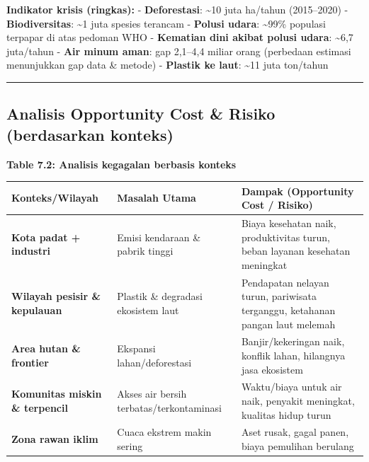 \documentclass[
  letterpaper,
  DIV=11,
  numbers=noendperiod]{scrreprt}
\begin{document}
\textbf{Indikator krisis (ringkas):} - \textbf{Deforestasi}:
\textasciitilde10 juta ha/tahun (2015--2020) - \textbf{Biodiversitas}:
\textasciitilde1 juta spesies terancam - \textbf{Polusi udara}:
\textasciitilde99\% populasi terpapar di atas pedoman WHO -
\textbf{Kematian dini akibat polusi udara}: \textasciitilde6,7
juta/tahun - \textbf{Air minum aman}: gap 2,1--4,4 miliar orang
(perbedaan estimasi menunjukkan gap data \& metode) - \textbf{Plastik ke
laut}: \textasciitilde11 juta ton/tahun

\begin{center}\rule{0.5\linewidth}{0.5pt}\end{center}

\subsection{Analisis Opportunity Cost \& Risiko (berdasarkan
konteks)}\label{analisis-opportunity-cost-risiko-berdasarkan-konteks}

\textbf{Table 7.2: Analisis kegagalan berbasis konteks}

\begin{longtable}[]{@{}
  >{\raggedright\arraybackslash}p{}
  >{\raggedright\arraybackslash}p{}
  >{\raggedright\arraybackslash}p{}@{}}
\toprule\noalign{}
\begin{minipage}[b]{\linewidth}\raggedright
Konteks/Wilayah
\end{minipage} & \begin{minipage}[b]{\linewidth}\raggedright
Masalah Utama
\end{minipage} & \begin{minipage}[b]{\linewidth}\raggedright
Dampak (Opportunity Cost / Risiko)
\end{minipage} \\
\midrule\noalign{}
\endhead
\bottomrule\noalign{}
\endlastfoot
\textbf{Kota padat + industri} & Emisi kendaraan \& pabrik tinggi &
Biaya kesehatan naik, produktivitas turun, beban layanan kesehatan
meningkat \\
\textbf{Wilayah pesisir \& kepulauan} & Plastik \& degradasi ekosistem
laut & Pendapatan nelayan turun, pariwisata terganggu, ketahanan pangan
laut melemah \\
\textbf{Area hutan \& frontier} & Ekspansi lahan/deforestasi &
Banjir/kekeringan naik, konflik lahan, hilangnya jasa ekosistem \\
\textbf{Komunitas miskin \& terpencil} & Akses air bersih
terbatas/terkontaminasi & Waktu/biaya untuk air naik, penyakit
meningkat, kualitas hidup turun \\
\textbf{Zona rawan iklim} & Cuaca ekstrem makin sering & Aset rusak,
gagal panen, biaya pemulihan berulang \\
\end{longtable}
\end{document}

